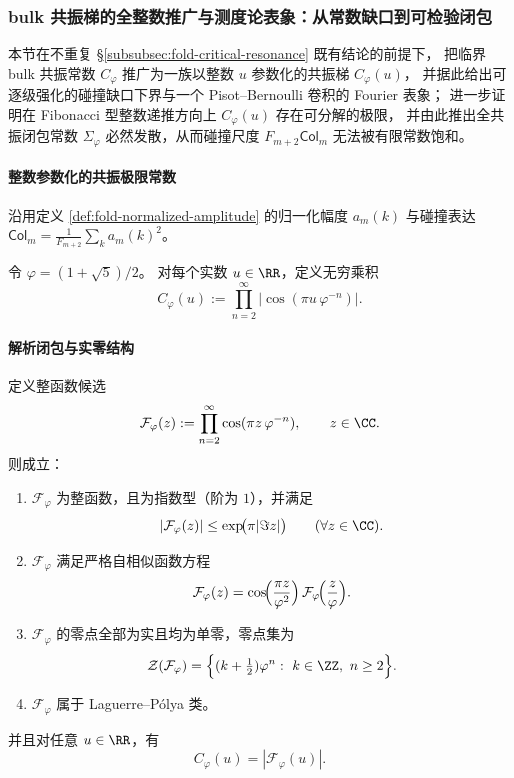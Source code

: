 \subsubsection{bulk 共振梯的全整数推广与测度论表象：从常数缺口到可检验闭包}\label{subsubsec:fold-bulk-resonance-integer-ladder}
本节在不重复 \S\ref{subsubsec:fold-critical-resonance} 既有结论的前提下，
把临界 bulk 共振常数 \(C_\varphi\) 推广为一族以整数 \(u\) 参数化的共振梯 \(C_\varphi(u)\)，
并据此给出可逐级强化的碰撞缺口下界与一个 Pisot--Bernoulli 卷积的 Fourier 表象；
进一步证明在 Fibonacci 型整数递推方向上 \(C_\varphi(u)\) 存在可分解的极限，
并由此推出全共振闭包常数 \(\Sigma_\varphi\) 必然发散，从而碰撞尺度 \(F_{m+2}\mathsf{Col}_m\) 无法被有限常数饱和。

\paragraph{整数参数化的共振极限常数}
沿用定义 \ref{def:fold-normalized-amplitude} 的归一化幅度 \(a_m(k)\) 与碰撞表达
\(
\mathsf{Col}_m=\frac{1}{F_{m+2}}\sum_{k}a_m(k)^2
\)。

\begin{definition}[共振梯常数]\label{def:fold-critical-resonance-ladder}
令 \(\varphi=(1+\sqrt 5)/2\)。
对每个实数 \(u\in\RR\)，定义无穷乘积
\[
C_\varphi(u):=\prod_{n=2}^{\infty}\bigl|\cos(\pi u\,\varphi^{-n})\bigr|.
\]
\end{definition}

\paragraph{解析闭包与实零结构}
\begin{theorem}\label{thm:fold-resonance-entire-lp}
定义整函数候选
\[
\mathcal{F}_\varphi(z):=\prod_{n=2}^{\infty}\cos(\pi z\,\varphi^{-n}),\qquad z\in\CC.
\]
则成立：
\begin{enumerate}
  \item \(\mathcal{F}_\varphi\) 为整函数，且为指数型（阶为 \(1\)），并满足
  \[
  |\mathcal{F}_\varphi(z)|\le \exp\!\bigl(\pi|\Im z|\bigr)\qquad(\forall z\in\CC).
  \]
  \item \(\mathcal{F}_\varphi\) 满足严格自相似函数方程
  \[
  \mathcal{F}_\varphi(z)=\cos\!\Bigl(\frac{\pi z}{\varphi^2}\Bigr)\,\mathcal{F}_\varphi\!\Bigl(\frac{z}{\varphi}\Bigr).
  \]
  \item \(\mathcal{F}_\varphi\) 的零点全部为实且均为单零，零点集为
  \[
  \mathcal{Z}(\mathcal{F}_\varphi)=\Bigl\{(k+\tfrac12)\varphi^n:\ k\in\ZZ,\ n\ge 2\Bigr\}.
  \]
  \item \(\mathcal{F}_\varphi\) 属于 Laguerre--P\'olya 类。
\end{enumerate}
并且对任意 \(u\in\RR\)，有
\[
C_\varphi(u)=|\mathcal{F}_\varphi(u)|.
\]
\end{theorem}

